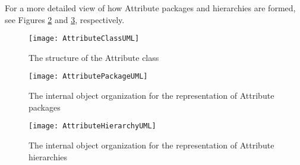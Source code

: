 For a more detailed view of how Attribute packages and hierarchies are formed, see Figures \ref{fig:AttributePackageUML} and \ref{fig:AttributeHierarchyUML}, respectively.

\begin{figure}[h]
\centering
\texttt{[image: AttributeClassUML]}
\caption{The structure of the Attribute class}
\label{fig:AttributeClassUML}
\end{figure}
\clearpage

\begin{figure}[h]
\centering
\texttt{[image: AttributePackageUML]}
\caption{The internal object organization for the representation of Attribute packages}
\label{fig:AttributePackageUML}
\end{figure}
\clearpage

\begin{figure}[h]
\centering
\texttt{[image: AttributeHierarchyUML]}
\caption{The internal object organization for the representation of Attribute hierarchies}
\label{fig:AttributeHierarchyUML}
\end{figure}
\clearpage
